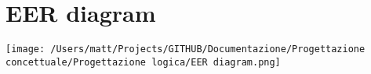 \chapter{EER diagram}

\texttt{[image: /Users/matt/Projects/GITHUB/Documentazione/Progettazione concettuale/Progettazione logica/EER diagram.png]}
